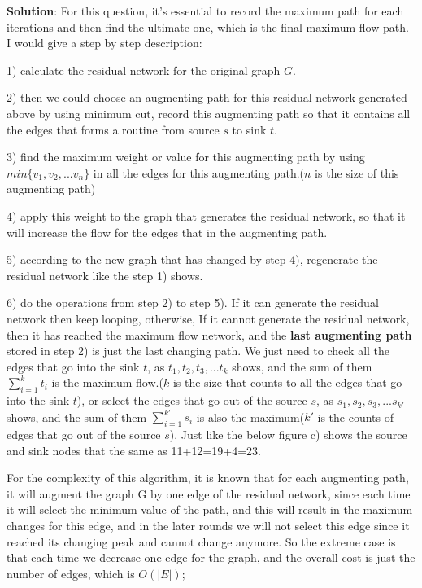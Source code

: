 \documentclass{article}
\begin{document}
\textbf{Solution}: For this question, it's essential to record the maximum path for each iterations and then find the
ultimate one, which is the final maximum flow path. I would give a step by step description:

1) calculate the residual network for the original graph $G$.

2) then we could choose an augmenting path for this residual network generated above by using minimum cut, record this augmenting path so that it contains all the edges that forms a routine from source $s$ to sink $t$.

3) find the maximum weight or value for this augmenting path by using $min\{v_{1}, v_{2}, ... v_{n}\}$ in all the edges
for this augmenting path.($n$ is the size of this augmenting path)

4) apply this weight to the graph that generates the residual network, so that it will increase the flow for the edges
that in the augmenting path.

5) according to the new graph that has changed by step 4), regenerate the residual network like the step 1) shows.

6) do the operations from step 2) to step 5). If it can generate the residual network then keep looping, otherwise, If it cannot generate the residual network, then it has reached the maximum flow network, and the \textbf{last augmenting path} stored in step 2) is just the last changing path. We just need to check all the edges that go into the sink $t$, as ${t_{1}, t_{2}, t_{3}, ... t_{k}}$ shows, and the sum of them $\sum_{i=1}^k{t_i}$ is the maximum flow.($k$ is the size that counts to all the edges that go into the sink $t$), or select the edges that go out of the source $s$, as ${s_{1},s_{2}, s_{3}, ... s_{k\prime}}$ shows, and the sum of them $\sum_{i=1}^{k\prime}{s_i}$ is also the maximum(${k\prime}$ is the counts of edges that go out of the source $s$). Just like the below figure c) shows the source and sink nodes that the same as 11+12=19+4=23.

For the complexity of this algorithm, it is known that for each augmenting path, it will augment the graph G by one edge of the residual network, since each time it will select the minimum value of the path, and this will result in the maximum changes for this edge, and in the later rounds we will not select this edge since it reached its changing peak and cannot change anymore. So the extreme case is that each time we decrease one edge for the graph, and the overall cost is just the number of edges, which is $O(|E|)$;
\end{document}
